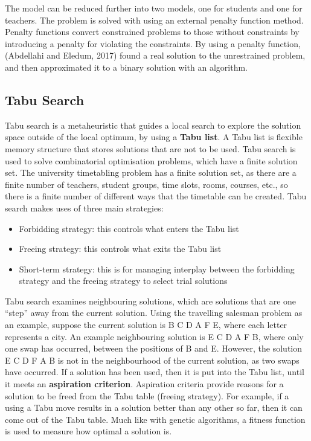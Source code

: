 \documentclass[a4paper, 12pt]{report}
\begin{document}
The model can be reduced further into two models, one for students and one for
teachers.
The problem is solved with using an external penalty function method. Penalty
functions convert constrained problems to those without constraints by
introducing a penalty for violating the constraints.
By using a penalty function, (Abdellahi and Eledum, 2017) found a real solution
to the unrestrained problem, and then approximated it to a binary solution with
an algorithm.

\subsection{Tabu Search}

Tabu search is a metaheuristic that guides a local search to explore the
solution space outside of the local optimum, by using a \textbf{Tabu list}.
A Tabu list is flexible memory structure that stores solutions that are not to
be used.
Tabu search is used to solve combinatorial optimisation problems, which have a
finite solution set.
The university timetabling problem has a finite solution set, as there are a
finite number of teachers, student groups, time slots, rooms, courses, etc., so
there is a finite number of different ways that the timetable can be created.
Tabu search makes uses of three main strategies:
\begin{itemize}
	\item Forbidding strategy: this controls what enters the Tabu list
	\item Freeing strategy: this controls what exits the Tabu list
	\item Short-term strategy: this is for managing interplay between the
		forbidding strategy and the freeing strategy to select trial solutions
\end{itemize}
Tabu search examines neighbouring solutions, which are solutions that are one
“step” away from the current solution.
Using the travelling salesman problem as an example, suppose the current
solution is B C D A F E, where each letter represents a city.
An example neighbouring solution is E C D A F B, where only one swap has
occurred, between the positions of B and E.
However, the solution E C D F A B is not in the neighbourhood of the current
solution, as two swaps have occurred.
If a solution has been used, then it is put into the Tabu list, until it meets
an \textbf{aspiration criterion}.
Aspiration criteria provide reasons for a solution to be freed from the Tabu
table (freeing strategy).
For example, if a using a Tabu move results in a solution better than any other
so far, then it can come out of the Tabu table. Much like with genetic
algorithms, a fitness function is used to measure how optimal a solution is.
\end{document}
